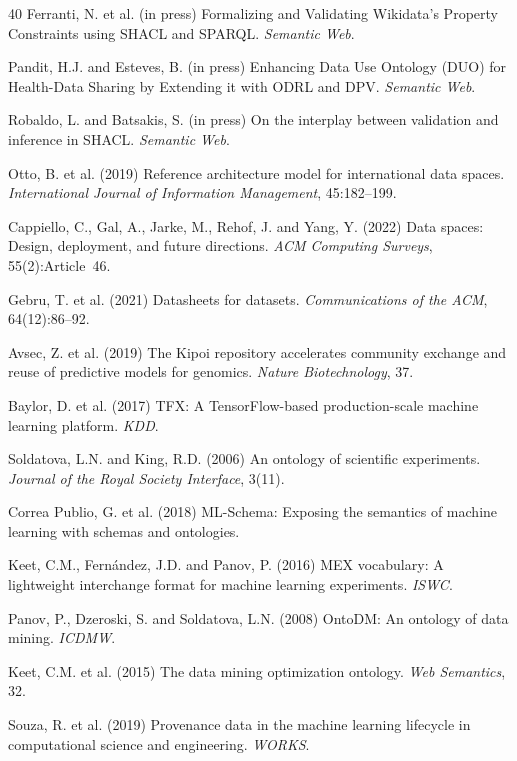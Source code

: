 \documentclass[11pt,a4paper]{article}
\begin{document}
\begin{thebibliography}{40}
 Ferranti, N. et al. (in press) Formalizing and Validating Wikidata's Property Constraints using SHACL and SPARQL. \emph{Semantic Web}.

 Pandit, H.J. and Esteves, B. (in press) Enhancing Data Use Ontology (DUO) for Health-Data Sharing by Extending it with ODRL and DPV. \emph{Semantic Web}.

 Robaldo, L. and Batsakis, S. (in press) On the interplay between validation and inference in SHACL. \emph{Semantic Web}.

 Otto, B. et al. (2019) Reference architecture model for international data spaces. \emph{International Journal of Information Management}, 45:182--199.

 Cappiello, C., Gal, A., Jarke, M., Rehof, J. and Yang, Y. (2022) Data spaces: Design, deployment, and future directions. \emph{ACM Computing Surveys}, 55(2):Article~46.

 Gebru, T. et al. (2021) Datasheets for datasets. \emph{Communications of the ACM}, 64(12):86--92.

 Avsec, Z. et al. (2019) The Kipoi repository accelerates community exchange and reuse of predictive models for genomics. \emph{Nature Biotechnology}, 37.

 Baylor, D. et al. (2017) TFX: A TensorFlow-based production-scale machine learning platform. \emph{KDD}.

 Soldatova, L.N. and King, R.D. (2006) An ontology of scientific experiments. \emph{Journal of the Royal Society Interface}, 3(11).

 Correa Publio, G. et al. (2018) ML-Schema: Exposing the semantics of machine learning with schemas and ontologies.

 Keet, C.M., Fernández, J.D. and Panov, P. (2016) MEX vocabulary: A lightweight interchange format for machine learning experiments. \emph{ISWC}.

 Panov, P., Dzeroski, S. and Soldatova, L.N. (2008) OntoDM: An ontology of data mining. \emph{ICDMW}.

 Keet, C.M. et al. (2015) The data mining optimization ontology. \emph{Web Semantics}, 32.

 Souza, R. et al. (2019) Provenance data in the machine learning lifecycle in computational science and engineering. \emph{WORKS}.


\end{thebibliography}
\end{document}
